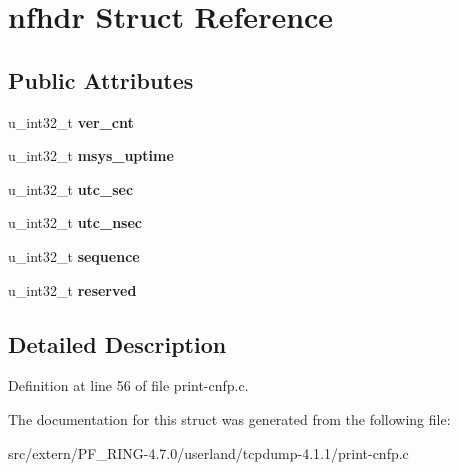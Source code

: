 \hypertarget{structnfhdr}{
\section{nfhdr Struct Reference}
\label{structnfhdr}
}
\subsection*{Public Attributes}
\begin{DoxyCompactItemize}
\item 
\hypertarget{structnfhdr_ac969d77a32e76c33c36aa34d88329234}{
u\_\-int32\_\-t {\bfseries ver\_\-cnt}}
\label{structnfhdr_ac969d77a32e76c33c36aa34d88329234}

\item 
\hypertarget{structnfhdr_a350d57b6ebdddf44c13d960fed23c30a}{
u\_\-int32\_\-t {\bfseries msys\_\-uptime}}
\label{structnfhdr_a350d57b6ebdddf44c13d960fed23c30a}

\item 
\hypertarget{structnfhdr_a5664513d3b024d88d2243f5db15eface}{
u\_\-int32\_\-t {\bfseries utc\_\-sec}}
\label{structnfhdr_a5664513d3b024d88d2243f5db15eface}

\item 
\hypertarget{structnfhdr_a120a526ca1953b79fc0072db21378026}{
u\_\-int32\_\-t {\bfseries utc\_\-nsec}}
\label{structnfhdr_a120a526ca1953b79fc0072db21378026}

\item 
\hypertarget{structnfhdr_abe7e665b74bd53a776b2d7866425ba71}{
u\_\-int32\_\-t {\bfseries sequence}}
\label{structnfhdr_abe7e665b74bd53a776b2d7866425ba71}

\item 
\hypertarget{structnfhdr_a469ace850d60960e6e62dfdd51177363}{
u\_\-int32\_\-t {\bfseries reserved}}
\label{structnfhdr_a469ace850d60960e6e62dfdd51177363}

\end{DoxyCompactItemize}


\subsection{Detailed Description}


Definition at line 56 of file print-\/cnfp.c.



The documentation for this struct was generated from the following file:\begin{DoxyCompactItemize}
\item 
src/extern/PF\_\-RING-\/4.7.0/userland/tcpdump-\/4.1.1/print-\/cnfp.c\end{DoxyCompactItemize}
